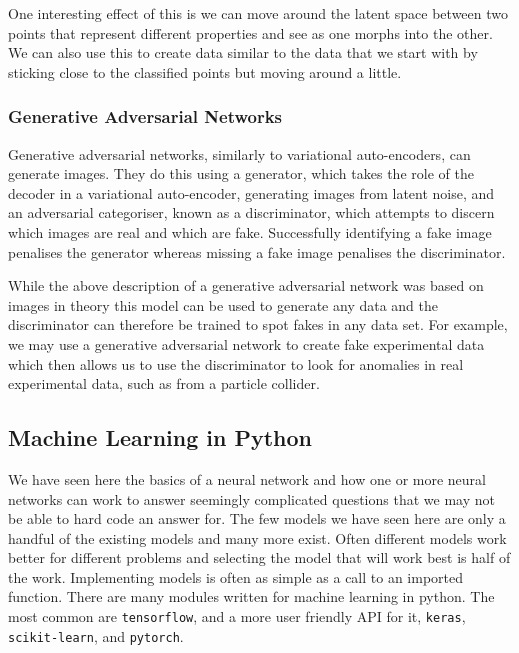 \documentclass[a4paper]{article}
\begin{document}
    One interesting effect of this is we can move around the latent space between two points that represent different properties and see as one morphs into the other.
    We can also use this to create data similar to the data that we start with by sticking close to the classified points but moving around a little.
    
    \subsubsection{Generative Adversarial Networks}
    Generative adversarial networks, similarly to variational auto-encoders, can generate images.
    They do this using a generator, which takes the role of the decoder in a variational auto-encoder, generating images from latent noise, and an adversarial categoriser, known as a discriminator, which attempts to discern which images are real and which are fake.
    Successfully identifying a fake image penalises the generator whereas missing a fake image penalises the discriminator.
    
    While the above description of a generative adversarial network was based on images in theory this model can be used to generate any data and the discriminator can therefore be trained to spot fakes in any data set.
    For example, we may use a generative adversarial network to create fake experimental data which then allows us to use the discriminator to look for anomalies in real experimental data, such as from a particle collider.

    \subsection{Machine Learning in Python}    
    We have seen here the basics of a neural network and how one or more neural networks can work to answer seemingly complicated questions that we may not be able to hard code an answer for.
    The few models we have seen here are only a handful of the existing models and many more exist.
    Often different models work better for different problems and selecting the model that will work best is half of the work.
    Implementing models is often as simple as a call to an imported function.
    There are many modules written for machine learning in python.
    The most common are \lstinline|tensorflow|, and a more user friendly API for it, \lstinline|keras|, \lstinline|scikit-learn|, and \lstinline|pytorch|.
    
    \appendix
\end{document}
